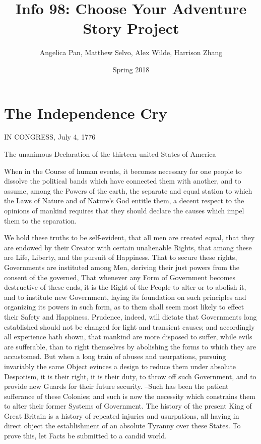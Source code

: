 \documentclass{article}
\begin{document}
\title{Info 98: Choose Your Adventure Story Project}

\author{Angelica Pan, Matthew Selvo, Alex Wilde, Harrison Zhang}
\date{Spring 2018}
\maketitle


\section{The Independence Cry}

IN CONGRESS, July 4, 1776

The unanimous Declaration of the thirteen united States of America



When in the Course of human events, it becomes necessary for
one people to dissolve the political bands which have connected
them with another, and to assume, among the Powers of the earth,
the separate and equal station to which the Laws of Nature and
of Nature's God entitle them, a decent respect to the opinions
of mankind requires that they should declare the causes which
impel them to the separation.

We hold these truths to be self-evident, that all men are created equal,
that they are endowed by their Creator with certain unalienable Rights,
that among these are Life, Liberty, and the pursuit of Happiness.
That to secure these rights, Governments are instituted among Men,
deriving their just powers from the consent of the governed,
That whenever any Form of Government becomes destructive of these ends,
it is the Right of the People to alter or to abolish it, and to institute
new Government, laying its foundation on such principles and organizing
its powers in such form, as to them shall seem most likely to effect
their Safety and Happiness.  Prudence, indeed, will dictate that Governments
long established should not be changed for light and transient causes;
and accordingly all experience hath shown, that mankind are more disposed
to suffer, while evils are sufferable, than to right themselves by abolishing
the forms to which they are accustomed.  But when a long train of abuses and
usurpations, pursuing invariably the same Object evinces a design to reduce
them under absolute Despotism, it is their right, it is their duty, to throw
off such Government, and to provide new Guards for their future security.
--Such has been the patient sufferance of these Colonies; and such is now
the necessity which constrains them to alter their former Systems of Government.
The history of the present King of Great Britain is a history of repeated
injuries and usurpations, all having in direct object the establishment
of an absolute Tyranny over these States.  To prove this, let Facts
be submitted to a candid world.
\end{document}
